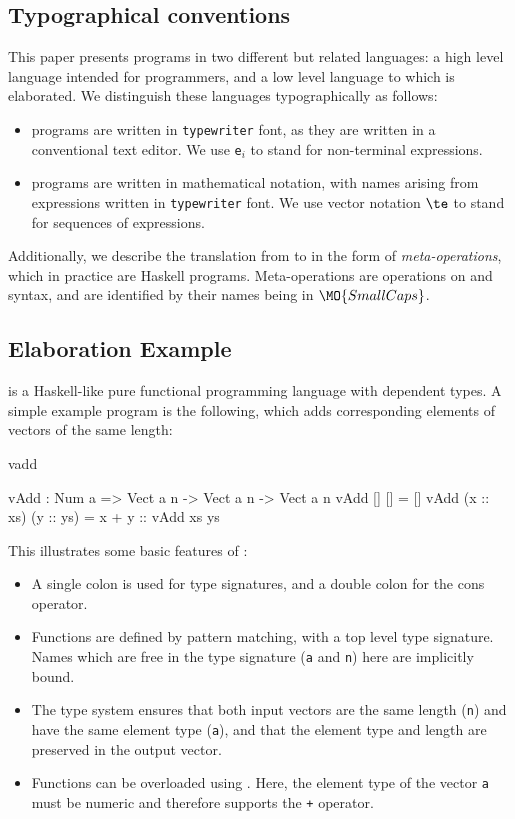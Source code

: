 \subsection{Typographical conventions}

This paper presents programs in two different but related languages: a high level
language \Idris{} intended for programmers, and a low level language \TT{} to
which \Idris{} is elaborated. We distinguish these languages typographically as
follows:

\begin{itemize}
\item \Idris{} programs are written in \texttt{typewriter} font, as they are written
in a conventional text editor. We use \texttt{e$_i$} to stand for non-terminal
expressions.
\item \TT{} programs are written in mathematical notation, with names arising
from \Idris{} expressions written in \texttt{typewriter} font. We use vector notation
$\te$ to stand for sequences of expressions.
\end{itemize}

Additionally, we describe the translation from \Idris{} to \TT{} in the form
of \emph{meta-operations}, which in practice are Haskell programs. Meta-operations
are operations on \Idris{} and \TT{} syntax, and are identified by their names being
in $\MO{SmallCaps}$.

\subsection{Elaboration Example}

\Idris{} is a Haskell-like pure functional programming language with dependent types.
A simple example program is the following, which adds corresponding elements of
vectors of the same length:

\begin{SaveVerbatim}{vadd}

vAdd : Num a => Vect a n -> Vect a n -> Vect a n
vAdd []        []        = []
vAdd (x :: xs) (y :: ys) = x + y :: vAdd xs ys

\end{SaveVerbatim}

\noindent
This illustrates some basic features of \Idris{}:

\begin{itemize}
\item A single colon is used for type signatures, and a double colon for the
cons operator.
\item Functions are defined by pattern matching, with a top level type signature.
Names which are free in the type signature (\texttt{a} and \texttt{n}) here
are implicitly bound.
\item The type system ensures that both input vectors are the same length (\texttt{n})
and have the same element type (\texttt{a}), and that the element type and length
are preserved in the output vector.
\item Functions can be overloaded using . Here, the element type
of the vector \texttt{a} must be numeric and therefore supports the \texttt{+} operator.
\end{itemize}

